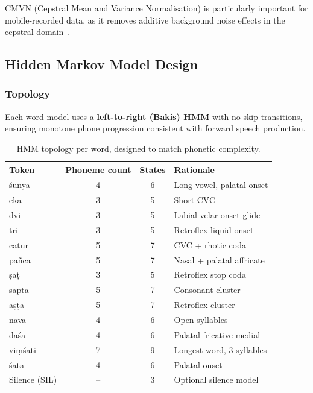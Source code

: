 \documentclass[12pt,a4paper]{article}
\begin{document}
CMVN (Cepstral Mean and Variance Normalisation) is particularly important for
mobile-recorded data, as it removes additive background noise effects in the
cepstral domain~\cite{atal1974effectiveness}.

\subsection{Hidden Markov Model Design}
\label{sec:hmm}

\subsubsection{Topology}

Each word model uses a \textbf{left-to-right (Bakis) HMM} with no skip
transitions, ensuring monotone phone progression consistent with forward
speech production.

\begin{table}[h!]
\centering
\caption{HMM topology per word, designed to match phonetic complexity.}
\label{tab:hmm}
\begin{tabular}{@{}lccl@{}}
\toprule
\textbf{Token} & \textbf{Phoneme count} &
\textbf{States} & \textbf{Rationale} \\
\midrule
\'{s}\={u}nya       & 4 & 6 & Long vowel, palatal onset \\
eka                 & 3 & 5 & Short CVC \\
dvi                 & 3 & 5 & Labial-velar onset glide \\
tri                 & 3 & 5 & Retroflex liquid onset \\
catur               & 5 & 7 & CVC + rhotic coda \\
pa\~{n}ca           & 5 & 7 & Nasal + palatal affricate \\
\d{s}a\d{t}         & 3 & 5 & Retroflex stop coda \\
sapta               & 5 & 7 & Consonant cluster \\
a\d{s}\d{t}a        & 5 & 7 & Retroflex cluster \\
nava                & 4 & 6 & Open syllables \\
da\'{s}a            & 4 & 6 & Palatal fricative medial \\
vi\d{m}\'{s}ati     & 7 & 9 & Longest word, 3 syllables \\
\'{s}ata            & 4 & 6 & Palatal onset \\
Silence (SIL)       & -- & 3 & Optional silence model \\
\bottomrule
\end{tabular}
\end{table}
\end{document}
